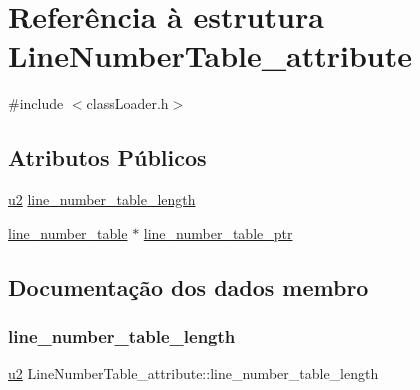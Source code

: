 \hypertarget{struct_line_number_table__attribute}{}\section{Referência à estrutura Line\+Number\+Table\+\_\+attribute}
\label{struct_line_number_table__attribute}


{\ttfamily \#include $<$class\+Loader.\+h$>$}

\subsection*{Atributos Públicos}
\begin{DoxyCompactItemize}
\item 
\hyperlink{util_8h_a55ef8d87fd202b8417704c089899c5b9}{u2} \hyperlink{struct_line_number_table__attribute_a758c7ed4a08f1398c0ab0966ea59d7d4}{line\+\_\+number\+\_\+table\+\_\+length}
\item 
\hyperlink{structline__number__table}{line\+\_\+number\+\_\+table} $\ast$ \hyperlink{struct_line_number_table__attribute_ac194cc6f527052717c72a7964d57871e}{line\+\_\+number\+\_\+table\+\_\+ptr}
\end{DoxyCompactItemize}


\subsection{Documentação dos dados membro}
\mbox{\label{struct_line_number_table__attribute_a758c7ed4a08f1398c0ab0966ea59d7d4}} 
\subsubsection{\texorpdfstring{line\+\_\+number\+\_\+table\+\_\+length}{line\_number\_table\_length}}
{\footnotesize\ttfamily \hyperlink{util_8h_a55ef8d87fd202b8417704c089899c5b9}{u2} Line\+Number\+Table\+\_\+attribute\+::line\+\_\+number\+\_\+table\+\_\+length}

\mbox{\label{struct_line_number_table__attribute_ac194cc6f527052717c72a7964d57871e}} 
